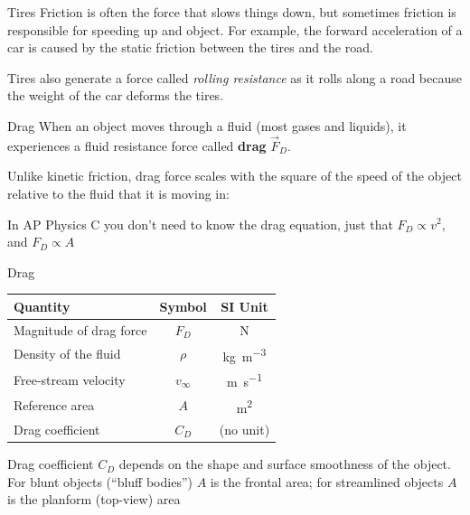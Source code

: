 \documentclass[12pt,compress,aspectratio=169]{beamer}
\begin{document}
\begin{frame}{Tires}
  Friction is often the force that slows things down, but sometimes friction is
  responsible for speeding up and object. For example, the forward acceleration
  of a car is caused by the static friction between the tires and the road.
  \begin{center}
  \end{center}
  Tires also generate a force called \emph{rolling resistance} as it rolls
  along a road because the weight of the car deforms the tires.
\end{frame}



\begin{frame}{Drag}
  When an object moves through a fluid (most gases and liquids), it experiences
  a fluid resistance force called \textbf{drag} $\vec F_D$.
  \begin{center}
  \end{center}
  Unlike kinetic friction, drag force scales with the square of the speed of the
  object relative to the fluid that it is moving in:
  

  \vspace{-.1in}In AP Physics C you don't need to know the drag equation,
  just that $F_D\propto v^2$, and $F_D\propto A$
\end{frame}



\begin{frame}{Drag}
  \begin{center}
    \begin{tabular}{l|c|c}
      \rowcolor{pink}
      \textbf{Quantity} & \textbf{Symbol} & \textbf{SI Unit} \\ \hline
      Magnitude of drag force & $F_D$     & \si\newton \\
      Density of the fluid    & $\rho$    & \si{\kilo\gram\per\metre\cubed}\\
      Free-stream velocity    & $v_\infty$ & \si{\metre\per\second}\\
      Reference area          & $A$       & \si{\metre\squared}\\
      Drag coefficient        & $C_D$     & (no unit)
    \end{tabular}
  \end{center}
  Drag coefficient $C_D$ depends on the shape and surface smoothness of the
  object. For blunt objects (``bluff bodies'') $A$ is the frontal area; for
  streamlined objects $A$ is the planform (top-view) area
\end{frame}
\end{document}
